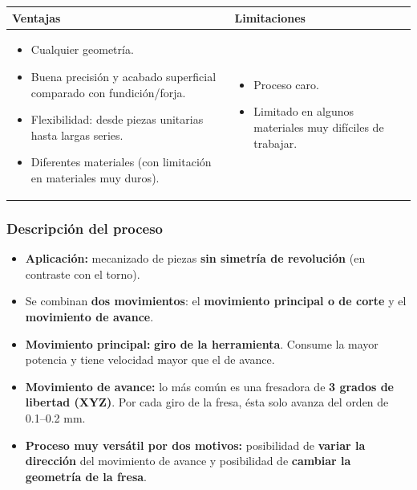 \documentclass[12pt,a4paper]{article}
\begin{document}
\begin{center}
	\begin{tabular}{@{}p{7.3cm}p{7.3cm}@{}}
		\toprule
		\textbf{Ventajas}
		                                                                            &
		\textbf{Limitaciones}
		\\
		\midrule
		\begin{itemize}[leftmargin=10pt,nosep]
			\item Cualquier geometría.
			\item Buena precisión y acabado superficial comparado con fundición/forja.
			\item Flexibilidad: desde piezas unitarias hasta largas series.
			\item Diferentes materiales (con limitación en materiales muy duros).
		\end{itemize} &
		\begin{itemize}[leftmargin=10pt,nosep]
			\item Proceso caro.
			\item Limitado en algunos materiales muy difíciles de trabajar.
		\end{itemize}               \\
		\bottomrule
	\end{tabular}
\end{center}

\subsubsection{Descripción del proceso}
\begin{itemize}
	\item \textbf{Aplicación:} mecanizado de piezas \textbf{sin simetría de
		      revolución} (en contraste con el torno).
	\item Se combinan \textbf{dos movimientos}: el \textbf{movimiento principal o
		      de corte} y el \textbf{movimiento de avance}.
	\item \textbf{Movimiento principal:} \textbf{giro de la herramienta}. Consume
	      la mayor potencia y tiene velocidad mayor que el de avance.
	\item \textbf{Movimiento de avance:} lo más común es una fresadora de
	      \textbf{3 grados de libertad (XYZ)}. Por cada giro de la fresa, ésta
	      solo avanza
	      del orden de 0.1--0.2 mm.
	\item \textbf{Proceso muy versátil por dos motivos:} posibilidad de
	      \textbf{variar la dirección} del movimiento de avance y posibilidad de
	      \textbf{cambiar la geometría de la fresa}.
\end{itemize}
\end{document}

